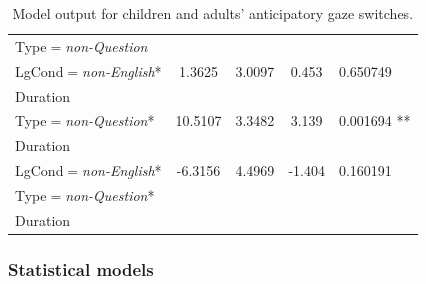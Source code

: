 \documentclass[authoryear, 12pt]{elsarticle}
\begin{document}
\begin{table}[h!]
\begin{small}
\begin{center}
\begin{tabular}{lcccl}
    \hspace*{5mm} Type$=$\textit{non-Question} &&&& \\
    LgCond$=$\textit{non-English}*		& 1.3625		& 3.0097		& 0.453	& 0.650749     	\\
    \hspace*{5mm} Duration &&&& \\
    Type$=$\textit{non-Question}*		& 10.5107		& 3.3482		& 3.139	& 0.001694  ** 	\\
    \hspace*{5mm} Duration &&&& \\
    LgCond$=$\textit{non-English}*		& -6.3156		& 4.4969		& -1.404	& 0.160191 	\\    
    \hspace*{5mm} Type$=$\textit{non-Question}* &&&& \\
    \hspace*{5mm} Duration &&&& \\
    \hline
  \end{tabular}
\end{center}
  \end{small}
  \caption{Model output for children and adults' anticipatory gaze switches.}
\label{tab:E1-models}
\end{table}

\subsubsection{Statistical models}
\label{sec:models1}
\end{document}
